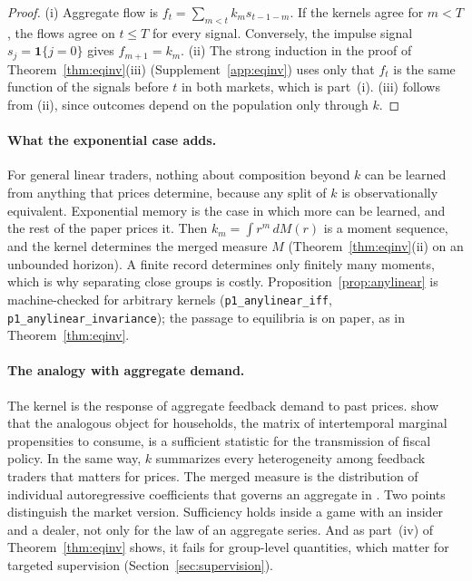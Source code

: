 \documentclass[12pt]{article}
\theoremstyle{definition}
\theoremstyle{remark}
\begin{document}
\begin{proof}
(i) Aggregate flow is $f_t=\sum_{m<t}k_ms_{t-1-m}$. If the kernels agree for $m<T$, the flows agree on $t\le T$ for every signal. Conversely, the impulse signal $s_j=\mathbf 1\{j=0\}$ gives $f_{m+1}=k_m$. (ii) The strong induction in the proof of Theorem~\ref{thm:eqinv}(iii) (Supplement~\ref{app:eqinv}) uses only that $f_t$ is the same function of the signals before $t$ in both markets, which is part~(i). (iii) follows from (ii), since outcomes depend on the population only through $k$.
\end{proof}

\paragraph{What the exponential case adds.} For general linear traders, nothing about composition beyond $k$ can be learned from anything that prices determine, because any split of $k$ is observationally equivalent. Exponential memory is the case in which more can be learned, and the rest of the paper prices it. Then $k_m=\int r^m\,dM(r)$ is a moment sequence, and the kernel determines the merged measure $M$ (Theorem~\ref{thm:eqinv}(ii) on an unbounded horizon). A finite record determines only finitely many moments, which is why separating close groups is costly. Proposition~\ref{prop:anylinear} is machine-checked for arbitrary kernels (\texttt{p1\_anylinear\_iff}, \texttt{p1\_anylinear\_invariance}); the passage to equilibria is on paper, as in Theorem~\ref{thm:eqinv}.

\paragraph{The analogy with aggregate demand.} The kernel is the response of aggregate feedback demand to past prices. \citet{auclert2024} show that the analogous object for households, the matrix of intertemporal marginal propensities to consume, is a sufficient statistic for the transmission of fiscal policy. In the same way, $k$ summarizes every heterogeneity among feedback traders that matters for prices. The merged measure is the distribution of individual autoregressive coefficients that governs an aggregate in \citet{granger1980}. Two points distinguish the market version. Sufficiency holds inside a game with an insider and a dealer, not only for the law of an aggregate series. And as part~(iv) of Theorem~\ref{thm:eqinv} shows, it fails for group-level quantities, which matter for targeted supervision (Section~\ref{sec:supervision}).
\end{document}
